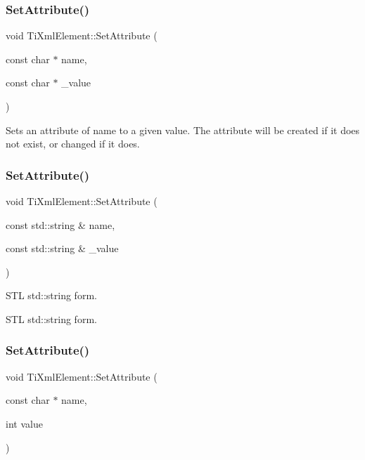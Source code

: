 \subsubsection{\texorpdfstring{Set\+Attribute()}{SetAttribute()}\hspace{0.1cm}{\footnotesize\ttfamily [1/3]}}
{\footnotesize\ttfamily void Ti\+Xml\+Element\+::\+Set\+Attribute (\begin{DoxyParamCaption}\item[{const char $\ast$}]{name,  }\item[{const char $\ast$}]{\+\_\+value }\end{DoxyParamCaption})}

Sets an attribute of name to a given value. The attribute will be created if it does not exist, or changed if it does. \hypertarget{class_ti_xml_element_a80ed65b1d194c71c6c9986ae42337d7d}{}\label{class_ti_xml_element_a80ed65b1d194c71c6c9986ae42337d7d} 
\subsubsection{\texorpdfstring{Set\+Attribute()}{SetAttribute()}\hspace{0.1cm}{\footnotesize\ttfamily [2/3]}}
{\footnotesize\ttfamily void Ti\+Xml\+Element\+::\+Set\+Attribute (\begin{DoxyParamCaption}\item[{const std\+::string \&}]{name,  }\item[{const std\+::string \&}]{\+\_\+value }\end{DoxyParamCaption})}



S\+TL std\+::string form. 

S\+TL std\+::string form. \hypertarget{class_ti_xml_element_ace6f4be75e373726d4774073d666d1a7}{}\label{class_ti_xml_element_ace6f4be75e373726d4774073d666d1a7} 
\subsubsection{\texorpdfstring{Set\+Attribute()}{SetAttribute()}\hspace{0.1cm}{\footnotesize\ttfamily [3/3]}}
{\footnotesize\ttfamily void Ti\+Xml\+Element\+::\+Set\+Attribute (\begin{DoxyParamCaption}\item[{const char $\ast$}]{name,  }\item[{int}]{value }\end{DoxyParamCaption})}

